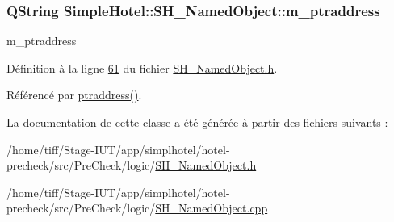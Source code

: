 \hypertarget{classSimpleHotel_1_1SH__NamedObject_ad79130d3b78530b13b1373a4c71e7522}{
\subsubsection[{m\-\_\-ptraddress}]{\setlength{\rightskip}{0pt plus 5cm}Q\-String Simple\-Hotel\-::\-S\-H\-\_\-\-Named\-Object\-::m\-\_\-ptraddress\hspace{0.3cm}{\ttfamily [private]}}}\label{classSimpleHotel_1_1SH__NamedObject_ad79130d3b78530b13b1373a4c71e7522}


m\-\_\-ptraddress 



Définition à la ligne \hyperlink{SH__NamedObject_8h_source_l00061}{61} du fichier \hyperlink{SH__NamedObject_8h_source}{S\-H\-\_\-\-Named\-Object.\-h}.



Référencé par \hyperlink{classSimpleHotel_1_1SH__NamedObject_af64f64d8af4f899c0626974bbf15698c}{ptraddress()}.



La documentation de cette classe a été générée à partir des fichiers suivants \-:\begin{DoxyCompactItemize}
\item 
/home/tiff/\-Stage-\/\-I\-U\-T/app/simplhotel/hotel-\/precheck/src/\-Pre\-Check/logic/\hyperlink{SH__NamedObject_8h}{S\-H\-\_\-\-Named\-Object.\-h}\item 
/home/tiff/\-Stage-\/\-I\-U\-T/app/simplhotel/hotel-\/precheck/src/\-Pre\-Check/logic/\hyperlink{SH__NamedObject_8cpp}{S\-H\-\_\-\-Named\-Object.\-cpp}\end{DoxyCompactItemize}
